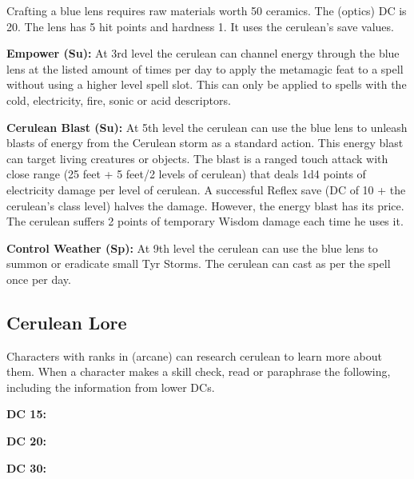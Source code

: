 Crafting a blue lens requires raw materials worth 50 ceramics. The  (optics) DC is 20. The lens has 5 hit points and hardness 1. It uses the cerulean’s save values.

\textbf{Empower (Su):} At 3rd level the cerulean can channel energy through the blue lens at the listed amount of times per day to apply the metamagic feat  to a spell without using a higher level spell slot. This can only be applied to spells with the cold, electricity, fire, sonic or acid descriptors.

\textbf{Cerulean Blast (Su):} At 5th level the cerulean can use the blue lens to unleash blasts of energy from the Cerulean storm as a standard action. This energy blast can target living creatures or objects. The blast is a ranged touch attack with close range (25 feet + 5 feet/2 levels of cerulean) that deals 1d4 points of electricity damage per level of cerulean. A successful Reflex save (DC of 10 + the cerulean’s class level) halves the damage. However, the energy blast has its price. The cerulean suffers 2 points of temporary Wisdom damage each time he uses it.

\textbf{Control Weather (Sp):} At 9th level the cerulean can use the blue lens to summon or eradicate small Tyr Storms. The cerulean can cast  as per the spell once per day.

\subsection{Cerulean Lore}
Characters with ranks in  (arcane) can research cerulean to learn more about them. When a character makes a skill check, read or paraphrase the following, including the information from lower DCs.

\textbf{DC 15:}

\textbf{DC 20:}

\textbf{DC 30:}